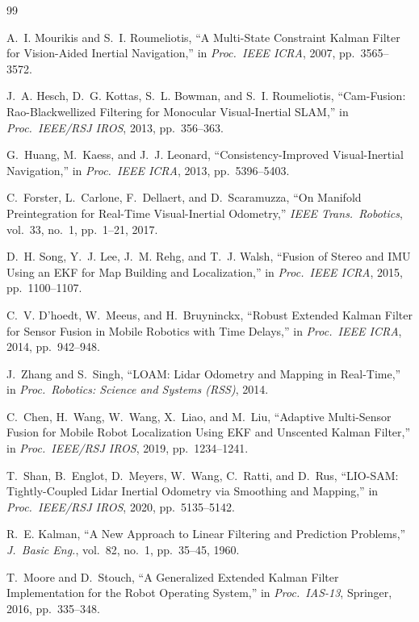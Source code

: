 \documentclass[conference]{IEEEtran}
\begin{document}
\begin{thebibliography}{99}

A.~I. Mourikis and S.~I. Roumeliotis, ``A Multi-State Constraint Kalman Filter
for Vision-Aided Inertial Navigation,'' in \emph{Proc.\ IEEE ICRA}, 2007,
pp.~3565--3572.

J.~A. Hesch, D.~G. Kottas, S.~L. Bowman, and S.~I. Roumeliotis, ``Cam-Fusion:
Rao-Blackwellized Filtering for Monocular Visual-Inertial SLAM,'' in
\emph{Proc.\ IEEE/RSJ IROS}, 2013, pp.~356--363.

G.~Huang, M.~Kaess, and J.~J. Leonard, ``Consistency-Improved Visual-Inertial
Navigation,'' in \emph{Proc.\ IEEE ICRA}, 2013, pp.~5396--5403.

C.~Forster, L.~Carlone, F.~Dellaert, and D.~Scaramuzza, ``On Manifold
Preintegration for Real-Time Visual-Inertial Odometry,'' \emph{IEEE Trans.\
Robotics}, vol.~33, no.~1, pp.~1--21, 2017.

D.~H. Song, Y.~J. Lee, J.~M. Rehg, and T.~J. Walsh, ``Fusion of Stereo and IMU
Using an EKF for Map Building and Localization,'' in \emph{Proc.\ IEEE ICRA}, 2015,
pp.~1100--1107.

C.~V. D'hoedt, W.~Meeus, and H.~Bruyninckx, ``Robust Extended Kalman Filter for
Sensor Fusion in Mobile Robotics with Time Delays,'' in \emph{Proc.\ IEEE ICRA},
2014, pp.~942--948.

J.~Zhang and S.~Singh, ``LOAM: Lidar Odometry and Mapping in Real-Time,'' in
\emph{Proc.\ Robotics: Science and Systems (RSS)}, 2014.

C.~Chen, H.~Wang, W.~Wang, X.~Liao, and M.~Liu, ``Adaptive Multi-Sensor Fusion
for Mobile Robot Localization Using EKF and Unscented Kalman Filter,'' in
\emph{Proc.\ IEEE/RSJ IROS}, 2019, pp.~1234--1241.

T.~Shan, B.~Englot, D.~Meyers, W.~Wang, C.~Ratti, and D.~Rus, ``LIO-SAM:
Tightly-Coupled Lidar Inertial Odometry via Smoothing and Mapping,'' in
\emph{Proc.\ IEEE/RSJ IROS}, 2020, pp.~5135--5142.

R.~E. Kalman, ``A New Approach to Linear Filtering and Prediction Problems,''
\emph{J.\ Basic Eng.}, vol.~82, no.~1, pp.~35--45, 1960.

T.~Moore and D.~Stouch, ``A Generalized Extended Kalman Filter Implementation for
the Robot Operating System,'' in \emph{Proc.\ IAS-13}, Springer, 2016,
pp.~335--348.


\end{thebibliography}
\end{document}
